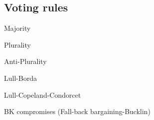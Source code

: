 	
%

\subsection{Voting rules}

\begin{genthm}{Majority}
	
\end{genthm}

\begin{genthm}{Plurality}
	
\end{genthm}

\begin{genthm}{Anti-Plurality}
	
\end{genthm}

\begin{genthm}{Lull-Borda}
	
\end{genthm}

%	

\begin{genthm}{Lull-Copeland-Condorcet}
	
\end{genthm}

%	
%
%	

\begin{genthm}{BK compromises (Fall-back bargaining-Bucklin)}
	
\end{genthm}

